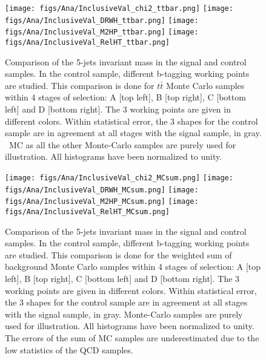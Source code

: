 \begin{figure}[!Hhtbp]
  \begin{center}
    \texttt{[image: figs/Ana/InclusiveVal\_chi2\_ttbar.png]}
    \texttt{[image: figs/Ana/InclusiveVal\_DRWH\_ttbar.png]}
    \texttt{[image: figs/Ana/InclusiveVal\_M2HP\_ttbar.png]}
    \texttt{[image: figs/Ana/InclusiveVal\_RelHT\_ttbar.png]}
    \caption{Comparison of the 5-jets invariant mass in the signal and control samples. In the control sample, different b-tagging working points are studied. This comparison is done for $t\bar{t}$ Monte Carlo samples within 4 stages of selection: A [top left], B [top right], C [bottom left] and D [bottom right]. The 3 working points are given in different colors. Within statistical error, the 3 shapes for the control sample are in agreement at all stages with the signal sample, in gray. \ttbar~MC as all the other Monte-Carlo samples are purely used for illustration. All histograms have been normalized to unity.}
    \label{fig:StageWPttbar}
  \end{center}
\end{figure}

\begin{figure}[!Hhtbp]
  \begin{center}
    \texttt{[image: figs/Ana/InclusiveVal\_chi2\_MCsum.png]}
    \texttt{[image: figs/Ana/InclusiveVal\_DRWH\_MCsum.png]}
    \texttt{[image: figs/Ana/InclusiveVal\_M2HP\_MCsum.png]}
    \texttt{[image: figs/Ana/InclusiveVal\_RelHT\_MCsum.png]}
    \caption{Comparison of the 5-jets invariant mass in the signal and control samples. In the control sample, different b-tagging working points are studied. This comparison is done for the weighted sum of background Monte Carlo samples within 4 stages of selection: A [top left], B [top right], C [bottom left] and D [bottom right]. The 3 working points are given in different colors. Within statistical error, the 3 shapes for the control sample are in agreement at all stages with the signal sample, in gray. Monte-Carlo samples are purely used for illustration. All histograms have been normalized to unity. The errors of the sum of MC samples are underestimated due to the low statistics of the QCD samples.}
    \label{fig:StageWPSum}
  \end{center}
\end{figure}

